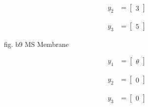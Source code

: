 \documentclass{article}
\begin{document}
  \begin{align}
    y_2 &= \begin{bmatrix}
           3
         \end{bmatrix}
  \end{align}
  
  \begin{align}
  y_3 &= \begin{bmatrix}
           5
         \end{bmatrix}
  \end{align}
  

fig. b9 MS Membrane

\begin{align}
    y_1 &= \begin{bmatrix}
           \theta
         \end{bmatrix}
  \end{align}
  
  \begin{align}
    y_2 &= \begin{bmatrix}
           0
         \end{bmatrix}
  \end{align}
  
  \begin{align}
  y_3 &= \begin{bmatrix}
           0
         \end{bmatrix}
  \end{align}
\end{document}
